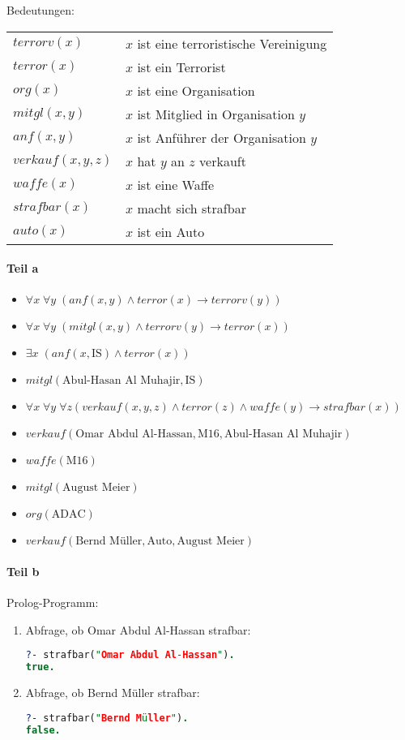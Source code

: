 Bedeutungen:\\
\begin{tabular}{l l}
$terrorv(x)$ & $x$ ist eine terroristische Vereinigung\\
$terror(x)$ & $x$ ist ein Terrorist\\
$org(x)$ & $x$ ist eine Organisation\\
$mitgl(x,y)$ & $x$ ist Mitglied in Organisation $y$\\
$anf(x,y)$ & $x$ ist Anführer der Organisation $y$\\
$verkauf(x,y,z)$ & $x$ hat $y$ an $z$ verkauft\\
$waffe(x)$ & $x$ ist eine Waffe\\
$strafbar(x)$ & $x$ macht sich strafbar\\
$auto(x)$ & $x$ ist ein Auto
\end{tabular}
\paragraph*{Teil a}
\begin{itemize}
\item $\forall x\; \forall y\;(anf(x,y) \wedge terror(x) \to terrorv(y) )$
\item $\forall x\;\forall y\; (mitgl(x,y) \wedge terrorv(y) \to terror(x))$
\item $\exists x\; (anf(x,\text{IS}) \wedge terror(x))$
\item $mitgl(\text{Abul-Hasan Al Muhajir},\text{IS})$
\item $\forall x\; \forall y\; \forall z ( verkauf(x,y,z) \wedge terror(z) \wedge waffe(y) \to strafbar(x))$
\item $verkauf(\text{Omar Abdul Al-Hassan},\text{M16},\text{Abul-Hasan Al Muhajir})$
\item $waffe(\text{M16})$
\item $mitgl(\text{August Meier})$
\item $org(\text{ADAC})$
\item $verkauf(\text{Bernd Müller}, \text{Auto},\text{August Meier})$
\end{itemize}

\paragraph*{Teil b}
Prolog-Programm:

\begin{enumerate}[label=(\roman*)]
\item Abfrage, ob Omar Abdul Al-Hassan strafbar:
\begin{lstlisting}[language=Prolog]
?- strafbar("Omar Abdul Al-Hassan").
true.
\end{lstlisting}
\item Abfrage, ob Bernd Müller strafbar:
\begin{lstlisting}[language=Prolog]
?- strafbar("Bernd Müller").
false.
\end{lstlisting}
\end{enumerate}
